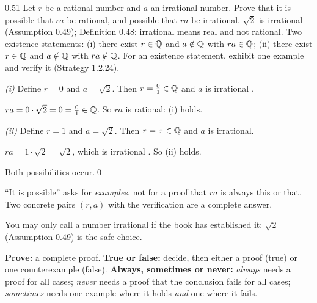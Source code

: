 \begin{bookex}[recommended]{0.51}
Let $r$ be a rational number and $a$ an irrational number. Prove that it is possible that $ra$ be rational, and possible that $ra$ be irrational.
\solution
\given $\sqrt2$ is irrational (Assumption 0.49); Definition 0.48: irrational means real and not rational.
\goal Two existence statements: (i) there exist $r\in\mathbb{Q}$ and $a\notin\mathbb{Q}$ with $ra\in\mathbb{Q}$; (ii) there exist $r\in\mathbb{Q}$ and $a\notin\mathbb{Q}$ with $ra\notin\mathbb{Q}$. 
\plan For an existence statement, exhibit one example and verify it (Strategy 1.2.24).
\begin{steps}
\item \emph{(i)} Define $r=0$ and $a=\sqrt2$. Then $r=\frac01\in\mathbb{Q}$  and $a$ is irrational .
\item $ra=0\cdot\sqrt2=0=\frac01\in\mathbb{Q}$. So $ra$ is rational: (i) holds.
\item \emph{(ii)} Define $r=1$ and $a=\sqrt2$. Then $r=\frac11\in\mathbb{Q}$ and $a$ is irrational.
\item $ra=1\cdot\sqrt2=\sqrt2$, which is irrational . So (ii) holds.
\end{steps}
\conclusion Both possibilities occur.\qed
\begin{compare}
\item ``It is possible'' asks for \emph{examples}, not for a proof that $ra$ is always this or that. Two concrete pairs $(r,a)$ with the verification are a complete answer.
\item You may only call a number irrational if the book has established it: $\sqrt2$ (Assumption 0.49) is the safe choice.
\end{compare}
\end{bookex}


\begin{strategy}
\textbf{Prove:} a complete proof. \textbf{True or false:} decide, then either a proof (true) or one counterexample (false). \textbf{Always, sometimes or never:} \emph{always} needs a proof for all cases; \emph{never} needs a proof that the conclusion fails for all cases; \emph{sometimes} needs one example where it holds \emph{and} one where it fails.
\end{strategy}


